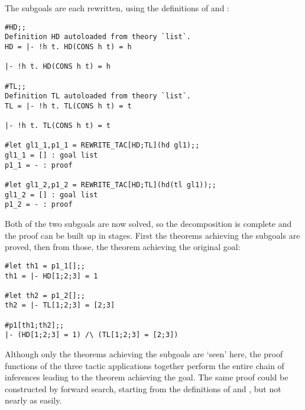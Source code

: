 \noindent The subgoals are each rewritten, using the definitions of
 and :

\begin{session}\begin{verbatim}
#HD;;
Definition HD autoloaded from theory `list`.
HD = |- !h t. HD(CONS h t) = h

|- !h t. HD(CONS h t) = h

#TL;;
Definition TL autoloaded from theory `list`.
TL = |- !h t. TL(CONS h t) = t

|- !h t. TL(CONS h t) = t

#let gl1_1,p1_1 = REWRITE_TAC[HD;TL](hd gl1);;
gl1_1 = [] : goal list
p1_1 = - : proof

#let gl1_2,p1_2 = REWRITE_TAC[HD;TL](hd(tl gl1));;
gl1_2 = [] : goal list
p1_2 = - : proof
\end{verbatim}\end{session}

\noindent Both of the two subgoals are now solved, so 
the decomposition is complete and
the proof can be built up in stages.  First the theorems achieving the
subgoals are proved, then from those, the theorem achieving the original goal:
\vfill
\newpage
\begin{session}\begin{verbatim}
#let th1 = p1_1[];;
th1 = |- HD[1;2;3] = 1

#let th2 = p1_2[];;
th2 = |- TL[1;2;3] = [2;3]

#p1[th1;th2];;
|- (HD[1;2;3] = 1) /\ (TL[1;2;3] = [2;3])
\end{verbatim}\end{session}

\noindent Although only the theorems achieving the subgoals are `seen' here,
the proof functions of the three tactic applications together perform
the entire chain
 of inferences leading to the theorem achieving the goal.
The same proof could be constructed by forward search, starting from
the definitions of  and , but not nearly as easily.

